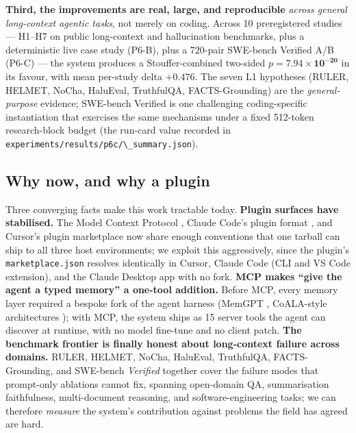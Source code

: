 \textbf{Third, the improvements are real, large, and reproducible} \emph{across general long-context agentic tasks}, not merely on coding. Across 10 preregistered studies --- H1--H7 on public long-context and hallucination benchmarks, plus a deterministic live case study (P6-B), plus a 720-pair SWE-bench Verified A/B (P6-C) --- the system produces a Stouffer-combined two-sided \(p = \mathbf{7.94 \times 10^{-20}}\) in its favour, with mean per-study delta \(\mathbf{+0.476}\). The seven L1 hypotheses (RULER, HELMET, NoCha, HaluEval, TruthfulQA, FACTS-Grounding) are the \emph{general-purpose} evidence; SWE-bench Verified is one challenging coding-specific instantiation that exercises the same mechanisms under a fixed 512-token research-block budget (the run-card value recorded in \passthrough{\lstinline!experiments/results/p6c/\_summary.json!}).

\subsection{Why now, and why a plugin}\label{why-now-and-why-a-plugin}

Three converging facts make this work tractable today. \textbf{Plugin surfaces have stabilised.} The Model Context Protocol \citep{anthropic2025mcp}, Claude Code's plugin format \citep{anthropic2025claudecode}, and Cursor's plugin marketplace \citep{cursor2025plugins} now share enough conventions that one tarball can ship to all three host environments; we exploit this aggressively, since the plugin's \passthrough{\lstinline!marketplace.json!} resolves identically in Cursor, Claude Code (CLI and VS Code extension), and the Claude Desktop app with no fork. \textbf{MCP makes ``give the agent a typed memory'' a one-tool addition.} Before MCP, every memory layer required a bespoke fork of the agent harness (MemGPT \citep{packer2023memgpt}, CoALA-style architectures \citep{sumers2024coala}); with MCP, the system ships as 15 server tools the agent can discover at runtime, with no model fine-tune and no client patch. \textbf{The benchmark frontier is finally honest about long-context failure across domains.} RULER, HELMET, NoCha, HaluEval, TruthfulQA, FACTS-Grounding, and SWE-bench \emph{Verified} together cover the failure modes that prompt-only ablations cannot fix, spanning open-domain QA, summarisation faithfulness, multi-document reasoning, and software-engineering tasks; we can therefore \emph{measure} the system's contribution against problems the field has agreed are hard.

